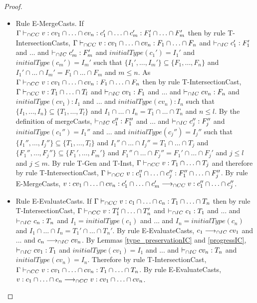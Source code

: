 \documentclass[a4paper]{article}
\begin{document}
\begin{proof}
\begin{itemize}
    \item Rule E-MergeCasts.
    If $\Gamma \vdash_{\cap CC} v : cv_1 \cap \ldots \cap cv_n : c_1' \cap \ldots \cap c_m' : F_1' \cap \ldots \cap F_m'$ then by rule T-IntersectionCasts, $\Gamma \vdash_{\cap CC} v : cv_1 \cap \ldots \cap cv_n : F_1 \cap \ldots \cap F_n$ and $\vdash_{\cap IC} c_1' : F_1'$ and ... and $\vdash_{\cap IC} c_m' : F_m'$ and $initialType(c_1') = I_1'$ and $initialType(c_m') = I_m'$ such that $\{I_1', \ldots, I_m'\} \subseteq \{F_1, \ldots, F_n\}$ and $I_1' \cap \ldots \cap I_m' = F_1 \cap \ldots \cap F_m$ and $m \leq n$.
    As $\Gamma \vdash_{\cap CC} v : cv_1 \cap \ldots \cap cv_n : F_1 \cap \ldots \cap F_n$ then by rule T-IntersectionCast, $\Gamma \vdash_{\cap CC} v : T_1 \cap \ldots \cap T_l$ and $\vdash_{\cap IC} cv_1 : F_1$ and ... and $\vdash_{\cap IC} cv_n : F_n$ and $initialType(cv_1) : I_1$ and ... and $initialType(cv_n) : I_n$ such that $\{I_1, \ldots, I_n\} \subseteq \{T_1, \ldots, T_l\}$ and $I_1 \cap \ldots \cap I_n = T_1 \cap \ldots \cap T_n$ and $n \leq l$.
    By the definition of mergeCasts, $\vdash_{\cap IC} c_1'' : F_1''$ and ... and $\vdash_{\cap IC} c_j'' : F_j''$ and $initialType(c_1'') = I_1''$ and ... and $initialType(c_j'') = I_j''$ such that $\{I_1'', \ldots, I_j''\} \subseteq \{T_1, \ldots, T_l\}$ and $I_1'' \cap \ldots \cap I_j'' = T_1 \cap \ldots \cap T_j$ and $\{F_1'', \ldots, F_j''\} \subseteq \{F_1', \ldots, F_m'\}$ and $F_1'' \cap \ldots \cap F_j'' = F_1' \cap \ldots \cap F_j'$ and $j \leq l$ and $j \leq m$.
    By rule T-Gen and T-Inst, $\Gamma \vdash_{\cap CC} v : T_1 \cap \ldots \cap T_j$ and therefore by rule T-IntersectionCast, $\Gamma \vdash_{\cap CC} v : c_1'' \cap \ldots \cap c_j'' : F_1'' \cap \ldots \cap F_j''$.
    By rule E-MergeCasts, $v : cv_1 \cap \ldots \cap cv_n : c_1' \cap \ldots \cap c_m' \longrightarrow_{\cap CC} v : c_1'' \cap \ldots \cap c_j''$.
    \item Rule E-EvaluateCasts.
    If $\Gamma \vdash_{\cap CC} v : c_1 \cap \ldots \cap c_n : T_1 \cap \ldots \cap T_n$ then by rule T-IntersectionCast, $\Gamma \vdash_{\cap CC} v : T_1' \cap \ldots \cap T_n'$ and $\vdash_{\cap IC} c_1 : T_1$ and ... and $\vdash_{\cap IC} c_n : T_n$ and $I_1 = initialType(c_1)$ and ... and $I_n = initialType(c_n)$ and $I_1 \cap \ldots \cap I_n = T_1' \cap \ldots \cap T_n'$.
    By rule E-EvaluateCasts, $c_1 \longrightarrow_{\cap IC} cv_1$ and ... and $c_n \longrightarrow_{\cap IC} cv_n$.
    By Lemmas \ref{type_preservationIC} and \ref{progressIC}, $\vdash_{\cap IC} cv_1 : T_1$ and $initialType(cv_1) = I_1$ and ... and $\vdash_{\cap IC} cv_n : T_n$ and $initialType(cv_n) = I_n$.
    Therefore by rule T-IntersectionCast, $\Gamma \vdash_{\cap CC} v : cv_1 \cap \ldots \cap cv_n : T_1 \cap \ldots \cap T_n$.
    By rule E-EvaluateCasts, $v : c_1 \cap \ldots \cap c_n \longrightarrow_{\cap CC} v : cv_1 \cap \ldots \cap cv_n$.

\end{itemize}
\end{proof}
\end{document}
